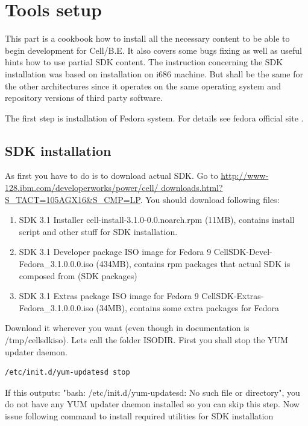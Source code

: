 \chapter{Tools setup}
\label{toolsSetup}

\par
This part is a cookbook how to install all the necessary content to be able to begin development for Cell/B.E.
It also covers some bugs fixing as well as useful hints how to use partial SDK content.
The instruction concerning the SDK installation was based on installation on i686 machine.
But shall be the same for the other architectures since it operates on the same operating system and repository versions of third party software.

\par
The first step is installation of Fedora system.
For details see fedora official site \cite{fedorasite}.

\section{SDK installation}

As first you have to do is to download actual SDK.
Go to \url{http://www-128.ibm.com/developerworks/power/cell/ downloads.html?S_TACT=105AGX16&S_CMP=LP}.
You should download following files:

\begin{enumerate}
\item SDK 3.1 Installer
cell-install-3.1.0-0.0.noarch.rpm  (11MB), contains install script and other stuff for SDK installation.
\item SDK 3.1 Developer package ISO image for Fedora 9
CellSDK-Devel-Fedora\_3.1.0.0.0.iso  (434MB), contains rpm packages that actual SDK is composed from (SDK packages)
\item SDK 3.1 Extras package ISO image for Fedora 9
CellSDK-Extras-Fedora\_3.1.0.0.0.iso  (34MB), contains some extra packages for Fedora
\end{enumerate}

Download it wherever you want (even though in documentation is /tmp/cellsdkiso).
Lets call the folder ISODIR.
First you shall stop the YUM updater daemon.

\begin{verbatim}
/etc/init.d/yum-updatesd stop
\end{verbatim}

If this outputs: "bash: /etc/init.d/yum-updatesd: No such file or directory", you do not have any YUM updater daemon installed so you can skip this step.
Now issue following command to install required utilities for SDK installation

